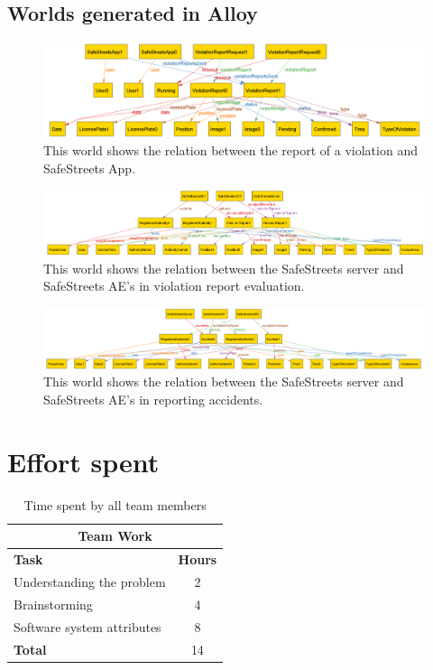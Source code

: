 \documentclass{article}
\begin{document}
		\subsection{Worlds generated in Alloy}
		\begin{figure}[H]
			\centering
			\includegraphics[width=1\textwidth]{images/alloyWorlds/world1.png}
			\caption[World 1]{This world shows the relation between the report of a violation and SafeStreets App.}
			\label{fig:alloy_world1}
		\end{figure}
		\begin{figure}[H]
			\centering
			\includegraphics[width=1\textwidth]{images/alloyWorlds/world2.png}
			\caption[World 2]{This world shows the relation between the SafeStreets server and SafeStreets AE's in violation report evaluation.}
			\label{fig:alloy_world2}
		\end{figure}
		\begin{figure}[H]
			\centering
			\includegraphics[width=1\textwidth]{images/alloyWorlds/world3.png}
			\caption[World 3]{This world shows the relation between the SafeStreets server and SafeStreets AE's in reporting accidents.}
			\label{fig:alloy_world3}
		\end{figure}
		
		\newpage
	\section{Effort spent}
	\begin{table}[h]
		\centering
		\begin{tabular}{l c}
			\hline\hline
			\multicolumn{2}{c}{\textbf{Team Work}} \\
			\hline
			\textbf{Task} & \textbf{Hours} \\ [0.5ex]
			\hline
			Understanding the problem & 2  \\
			Brainstorming & 4 \\
			Software system attributes & 8 \\
			\hline
			\textbf{Total} & 14  \\
			\hline
		\end{tabular}
		\caption{Time spent by all team members}
		\label{fig:Time spent by all team members}
	\end{table}
	
\end{document}
